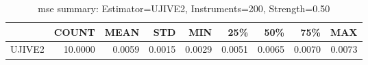 \begin{table}[ht]
\centering
\caption{mse summary: Estimator=UJIVE2, Instruments=200, Strength=0.50}
\begin{tabular}{lrrrrrrrr}
\toprule
 & COUNT & MEAN & STD & MIN & 25\% & 50\% & 75\% & MAX \\
\midrule
UJIVE2 & 10.0000 & 0.0059 & 0.0015 & 0.0029 & 0.0051 & 0.0065 & 0.0070 & 0.0073 \\
\bottomrule
\end{tabular}
\end{table}
